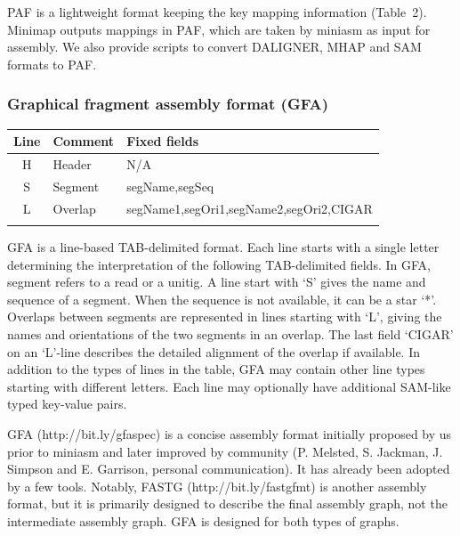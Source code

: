 \documentclass{bioinfo}
\begin{document}
\begin{methods}
PAF is a lightweight format keeping the key mapping information (Table~2).
Minimap outputs mappings in PAF, which are taken by miniasm as input for
assembly. We also provide scripts to convert DALIGNER, MHAP and SAM formats to
PAF.

\subsubsection{Graphical fragment assembly format (GFA)}

\begin{table}[ht]
{\footnotesize
\begin{tabular}{clp{5.8cm}}
\toprule
Line & Comment & Fixed fields \\
\midrule
H    & Header  & N/A \\
S    & Segment & segName,segSeq \\
L    & Overlap & segName1,segOri1,segName2,segOri2,CIGAR \\
\botrule
\end{tabular}
}{GFA is a line-based TAB-delimited format. Each line starts with a single
letter determining the interpretation of the following TAB-delimited fields. In
GFA, segment refers to a read or a unitig. A line start with `S' gives the name
and sequence of a segment. When the sequence is not available, it can be a star
`*'. Overlaps between segments are represented in lines starting with `L',
giving the names and orientations of the two segments in an overlap. The last
field `CIGAR' on an `L'-line describes the detailed alignment of the overlap if
available. In addition to the types of lines in the table, GFA may contain
other line types starting with different letters. Each line may optionally have
additional SAM-like typed key-value pairs.}
\end{table}

GFA (http://bit.ly/gfaspec) is a concise assembly format initially proposed by
us prior to miniasm and later improved by community (P. Melsted, S.  Jackman,
J. Simpson and E. Garrison, personal communication). It has already been
adopted by a few tools.  Notably, FASTG (http://bit.ly/fastgfmt) is another
assembly format, but it is primarily designed to describe the final assembly
graph, not the intermediate assembly graph. GFA is designed for both types of
graphs.

\end{methods}


\end{document}
